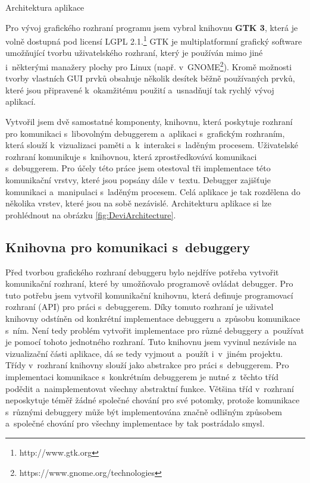 \documentclass[czech,bachelor,male,python,dept460,hidelinks]{diploma}						%
\newcommand{\parspace}[1][]{
	\ifthenelse{\isempty{#1}}{\vspace{0mm}}{\vspace{#1}}
	\par
}
\begin{document}
\begin{section}{Architektura aplikace}
	\parspace Pro vývoj grafického rozhraní programu jsem vybral knihovnu \textbf{GTK 3}, která je volně dostupná pod licensí LGPL 2.1.\footnote{http://www.gtk.org} 
	GTK je multiplatformní grafický software umožňující tvorbu uživatelského rozhraní, který je používán mimo jiné
	i~některými manažery plochy pro Linux (např. v~GNOME\footnote{https://www.gnome.org/technologies}). Kromě možnosti tvorby vlastních
	GUI prvků obsahuje několik desítek běžně používaných prvků, které jsou připravené k~okamžitému použití a~usnadňují tak rychlý vývoj aplikací.
	
	\parspace Vytvořil jsem dvě samostatné komponenty, knihovnu, která poskytuje rozhraní pro komunikaci s~libovolným debuggerem a~aplikaci s~grafickým rozhraním,
	která slouží k~vizualizaci paměti a~k~interakci s~laděným procesem.
	Uživatelské rozhraní komunikuje s~knihovnou, která zprostředkovává komunikaci s~debuggerem. Pro účely této práce jsem otestoval tři implementace
	této komunikační vrstvy, které jsou popsány dále v~textu. Debugger zajišťuje komunikaci a~manipulaci s~laděným procesem.
	Celá aplikace je tak rozdělena do několika vrstev, které jsou na sobě nezávislé. Architekturu aplikace si lze prohlédnout na obrázku \ref{fig:DeviArchitecture}.
	
		
\section{Knihovna pro komunikaci s~debuggery}
	\label{sec:DebuggerApi}
		Před tvorbou grafického rozhraní debuggeru bylo nejdříve potřeba vytvořit komunikační rozhraní, které by umožňovalo programově ovládat debugger.
		Pro tuto potřebu jsem vytvořil komunikační knihovnu, která definuje programovací rozhraní (API) pro práci s~debuggerem. Díky tomuto rozhraní
		je uživatel knihovny odstíněn od konkrétní implementace debuggeru a~způsobu komunikace s~ním. Není tedy problém vytvořit implementace pro různé debuggery
		a~používat je pomocí tohoto jednotného rozhraní. Tuto knihovnu jsem vyvinul nezávisle na vizualizační části aplikace, dá se tedy vyjmout
		a~použít i~v~jiném projektu. Třídy v~rozhraní knihovny slouží jako abstrakce pro práci s~debuggerem. Pro implementaci komunikace s~konkrétním
		debuggerem je nutné z~těchto tříd podědit a~naimplementovat všechny abstraktní funkce. Většina tříd v~rozhraní neposkytuje téměř žádné společné
		chování pro své potomky, protože komunikace s~různými debuggery může být implementována značně odlišným způsobem a~společné chování pro všechny
		implementace by tak postrádalo smysl.
		

\end{section}
\end{document}
